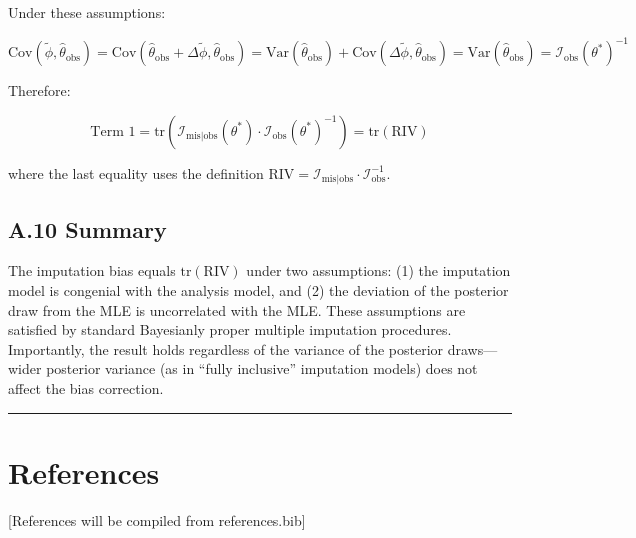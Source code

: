 \documentclass[
]{article}
\begin{document}
Under these assumptions:

\[\text{Cov}(\tilde{\phi}, \hat{\theta}_{\text{obs}}) = \text{Cov}(\hat{\theta}_{\text{obs}} + \Delta\tilde{\phi}, \hat{\theta}_{\text{obs}}) = \text{Var}(\hat{\theta}_{\text{obs}}) + \text{Cov}(\Delta\tilde{\phi}, \hat{\theta}_{\text{obs}}) = \text{Var}(\hat{\theta}_{\text{obs}}) = \mathcal{I}_{\text{obs}}(\theta^*)^{-1}\]

Therefore:

\[\text{Term 1} = \text{tr}\left(\mathcal{I}_{\text{mis}|\text{obs}}(\theta^*) \cdot \mathcal{I}_{\text{obs}}(\theta^*)^{-1}\right) = \text{tr}(\text{RIV})\]

where the last equality uses the definition
\(\text{RIV} = \mathcal{I}_{\text{mis}|\text{obs}} \cdot \mathcal{I}_{\text{obs}}^{-1}\).

\subsection{A.10 Summary}\label{a.10-summary}

The imputation bias equals \(\text{tr}(\text{RIV})\) under two
assumptions: (1) the imputation model is congenial with the analysis
model, and (2) the deviation of the posterior draw from the MLE is
uncorrelated with the MLE. These assumptions are satisfied by standard
Bayesianly proper multiple imputation procedures. Importantly, the
result holds regardless of the variance of the posterior draws---wider
posterior variance (as in ``fully inclusive'' imputation models) does
not affect the bias correction.

\begin{center}\rule{0.5\linewidth}{0.5pt}\end{center}

\section{References}\label{references}

{[}References will be compiled from references.bib{]}
\end{document}
